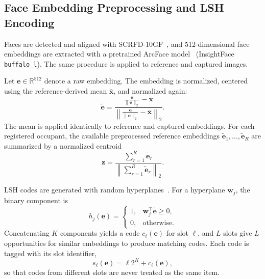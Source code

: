 \documentclass[pdflatex,sn-mathphys-num]{sn-jnl}%
\providecommand{\code}[1]{\texttt{#1}}%
\theoremstyle{thmstyleone}%
\theoremstyle{thmstyletwo}%
\theoremstyle{thmstylethree}%
\begin{document}
\subsection{Face Embedding Preprocessing and LSH Encoding}
\label{subsec:lsh_encoding}

Faces are detected and aligned with SCRFD-10GF~\cite{guo2022}, and 512-dimensional face embeddings are extracted with a pretrained ArcFace model~\cite{deng2019} (InsightFace \code{buffalo\_l}). The same procedure is applied to reference and captured images.

Let $\mathbf{e} \in \mathbb{R}^{512}$ denote a raw embedding. The embedding is normalized, centered using the reference-derived mean $\bar{\mathbf{x}}$, and normalized again:
\begin{equation}
    \tilde{\mathbf{e}}
    =
    \frac{
        \frac{\mathbf{e}}{\|\mathbf{e}\|_2}
        - \bar{\mathbf{x}}
    }{
        \left\|
        \frac{\mathbf{e}}{\|\mathbf{e}\|_2}
        - \bar{\mathbf{x}}
        \right\|_2
    }.
    \label{eq:embedding_preprocessing}
\end{equation}
The mean is applied identically to reference and captured embeddings. For each registered occupant, the available preprocessed reference embeddings $\tilde{\mathbf{e}}_1,\ldots,\tilde{\mathbf{e}}_R$ are summarized by a normalized centroid
\begin{equation}
    \mathbf{z}
    =
    \frac{
        \sum_{r=1}^{R}\tilde{\mathbf{e}}_r
    }{
        \left\|\sum_{r=1}^{R}\tilde{\mathbf{e}}_r\right\|_2
    }.
    \label{eq:identity_centroid}
\end{equation}

LSH codes are generated with random hyperplanes~\cite{charikar2002}. For a hyperplane $\mathbf{w}_j$, the binary component is
\begin{equation}
    h_j(\mathbf{e}) =
    \begin{cases}
        1, & \mathbf{w}_j^\top\tilde{\mathbf{e}} \geq 0,\\
        0, & \text{otherwise}.
    \end{cases}
    \label{eq:lsh_bit}
\end{equation}
Concatenating $K$ components yields a code $c_\ell(\mathbf{e})$ for slot $\ell$, and $L$ slots give $L$ opportunities for similar embeddings to produce matching codes. Each code is tagged with its slot identifier,
\begin{equation}
    s_\ell(\mathbf{e})
    =
    \ell 2^K + c_\ell(\mathbf{e}),
    \label{eq:tagged_code}
\end{equation}
so that codes from different slots are never treated as the same item.
\end{document}
